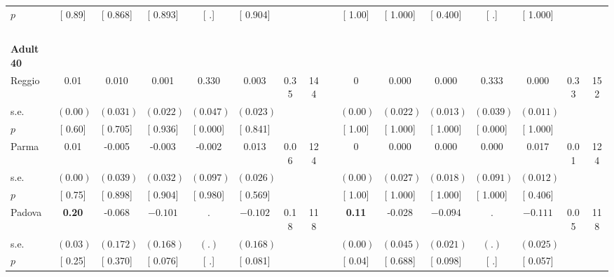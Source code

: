 \begin{longtable}{L{8em} c c c c c c c p{1em} c c c c c c c}
\quad \quad \quad \quad $ p$ & [     0.89] & [    0.868] & [    0.893] & [        .] & [    0.904] & & & & [     1.00] & [    1.000] & [    0.400] & [        .] & [    1.000] & &  \\[1em]
~\\[1em]
\quad \quad \textbf{Adult 40} & & & & & & & & & & & & & & & \\* 
\quad \quad \quad Reggio& 0.01 &     0.010 &     0.001 & $ \mathbf{    0.330}$ &     0.003 &      0.35 &       144 & & 0 &     0.000 &     0.000 & $ \mathbf{    0.333}$ &     0.000 &      0.33 &       152  \\*
\quad \quad \quad \quad s.e.& $ (     0.00)$ & $ (    0.031)$ & $ (    0.022)$ & $ (    0.047)$ & $ (    0.023)$ & & & & $ (     0.00)$ & $ (    0.022)$ & $ (    0.013)$ & $ (    0.039)$ & $ (    0.011)$ & &  \\*
\quad \quad \quad \quad $ p$ & [     0.60] & [    0.705] & [    0.936] & [    0.000] & [    0.841] & & & & [     1.00] & [    1.000] & [    1.000] & [    0.000] & [    1.000] & &  \\[1em]
\quad \quad \quad Parma& 0.01 &    -0.005 &    -0.003 &    -0.002 &     0.013 &      0.06 &       124 & & 0 &     0.000 &     0.000 &     0.000 &     0.017 &      0.01 &       124  \\*
\quad \quad \quad \quad s.e.& $ (     0.00)$ & $ (    0.039)$ & $ (    0.032)$ & $ (    0.097)$ & $ (    0.026)$ & & & & $ (     0.00)$ & $ (    0.027)$ & $ (    0.018)$ & $ (    0.091)$ & $ (    0.012)$ & &  \\*
\quad \quad \quad \quad $ p$ & [     0.75] & [    0.898] & [    0.904] & [    0.980] & [    0.569] & & & & [     1.00] & [    1.000] & [    1.000] & [    1.000] & [    0.406] & &  \\[1em]
\quad \quad \quad Padova& \textbf{     0.20} &    -0.068 & $ \mathbf{   -0.101}$ &         . & $ \mathbf{   -0.102}$ &      0.18 &       118 & & \textbf{     0.11} &    -0.028 & $ \mathbf{   -0.094}$ &         . & $ \mathbf{   -0.111}$ &      0.05 &       118  \\*
\quad \quad \quad \quad s.e.& $ (     0.03)$ & $ (    0.172)$ & $ (    0.168)$ & $ (        .)$ & $ (    0.168)$ & & & & $ (     0.00)$ & $ (    0.045)$ & $ (    0.021)$ & $ (        .)$ & $ (    0.025)$ & &  \\*
\quad \quad \quad \quad $ p$ & [     0.25] & [    0.370] & [    0.076] & [        .] & [    0.081] & & & & [     0.04] & [    0.688] & [    0.098] & [        .] & [    0.057] & &  \\[1em]

\end{longtable}
